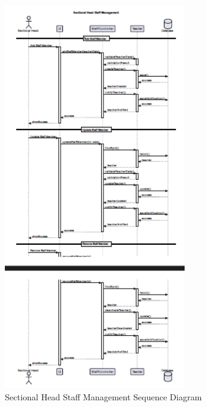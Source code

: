 \documentclass[12pt,a4paper]{report}
\begin{document}
\begin{figure}[htbp]
    \centering
    \includegraphics[width=0.7\textwidth]{sectional-head-staff-management-sequence.png}
    \caption{Sectional Head Staff Management Sequence Diagram}
    \label{fig:sectional-head-staff-management-sequence}
\end{figure}
\end{document}

